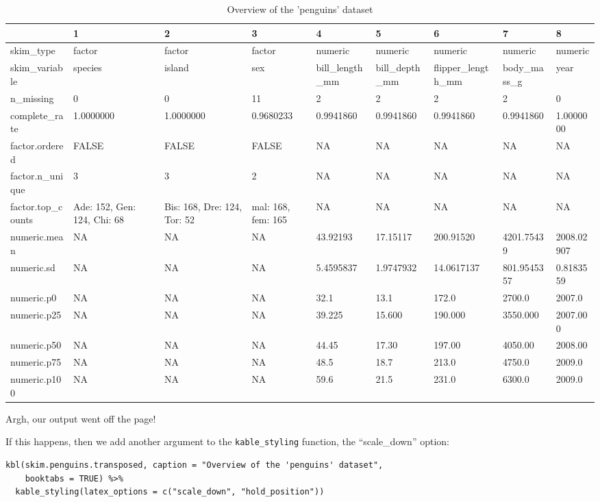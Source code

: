 \documentclass[
]{book}
\begin{document}
\begin{table}[!h]
\centering
\caption{\label{tab:nicetablepeng}Overview of the 'penguins' dataset}
\centering
\begin{tabular}[t]{lllllllll}
\toprule
  & 1 & 2 & 3 & 4 & 5 & 6 & 7 & 8\\
\midrule
skim\_type & factor & factor & factor & numeric & numeric & numeric & numeric & numeric\\
skim\_variable & species & island & sex & bill\_length\_mm & bill\_depth\_mm & flipper\_length\_mm & body\_mass\_g & year\\
n\_missing & 0 & 0 & 11 & 2 & 2 & 2 & 2 & 0\\
complete\_rate & 1.0000000 & 1.0000000 & 0.9680233 & 0.9941860 & 0.9941860 & 0.9941860 & 0.9941860 & 1.0000000\\
factor.ordered & FALSE & FALSE & FALSE & NA & NA & NA & NA & NA\\
\addlinespace
factor.n\_unique & 3 & 3 & 2 & NA & NA & NA & NA & NA\\
factor.top\_counts & Ade: 152, Gen: 124, Chi: 68 & Bis: 168, Dre: 124, Tor: 52 & mal: 168, fem: 165 & NA & NA & NA & NA & NA\\
numeric.mean & NA & NA & NA & 43.92193 & 17.15117 & 200.91520 & 4201.75439 & 2008.02907\\
numeric.sd & NA & NA & NA & 5.4595837 & 1.9747932 & 14.0617137 & 801.9545357 & 0.8183559\\
numeric.p0 & NA & NA & NA & 32.1 & 13.1 & 172.0 & 2700.0 & 2007.0\\
\addlinespace
numeric.p25 & NA & NA & NA & 39.225 & 15.600 & 190.000 & 3550.000 & 2007.000\\
numeric.p50 & NA & NA & NA & 44.45 & 17.30 & 197.00 & 4050.00 & 2008.00\\
numeric.p75 & NA & NA & NA & 48.5 & 18.7 & 213.0 & 4750.0 & 2009.0\\
numeric.p100 & NA & NA & NA & 59.6 & 21.5 & 231.0 & 6300.0 & 2009.0\\
\bottomrule
\end{tabular}
\end{table}

Argh, our output went off the page!

If this happens, then we add another argument to the \texttt{kable\_styling} function, the ``scale\_down'' option:

\begin{verbatim}
kbl(skim.penguins.transposed, caption = "Overview of the 'penguins' dataset",
    booktabs = TRUE) %>%
  kable_styling(latex_options = c("scale_down", "hold_position"))
\end{verbatim}
\end{document}
